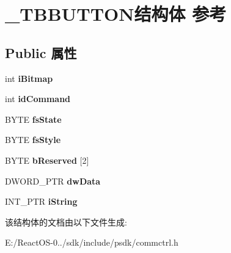 \hypertarget{struct___t_b_b_u_t_t_o_n}{}\section{\+\_\+\+T\+B\+B\+U\+T\+T\+O\+N结构体 参考}
\label{struct___t_b_b_u_t_t_o_n}
\subsection*{Public 属性}
\begin{DoxyCompactItemize}
\item 
\mbox{\label{struct___t_b_b_u_t_t_o_n_a8be01da77c08ef6d0e4f25575a366825}} 
int {\bfseries i\+Bitmap}
\item 
\mbox{\label{struct___t_b_b_u_t_t_o_n_a332c4169bcbc2be63dd246e082feea5c}} 
int {\bfseries id\+Command}
\item 
\mbox{\label{struct___t_b_b_u_t_t_o_n_a1a2644220fd0217d66641430418ebd59}} 
B\+Y\+TE {\bfseries fs\+State}
\item 
\mbox{\label{struct___t_b_b_u_t_t_o_n_a98b0c1cddce46699cb3f9c4b96b4a574}} 
B\+Y\+TE {\bfseries fs\+Style}
\item 
\mbox{\label{struct___t_b_b_u_t_t_o_n_ae18af2a65ad84df26ba4d2f0c4697194}} 
B\+Y\+TE {\bfseries b\+Reserved} \mbox{[}2\mbox{]}
\item 
\mbox{\label{struct___t_b_b_u_t_t_o_n_a3a7664c68c70a2fe191f8fdd9d9efe49}} 
D\+W\+O\+R\+D\+\_\+\+P\+TR {\bfseries dw\+Data}
\item 
\mbox{\label{struct___t_b_b_u_t_t_o_n_a31bc282f9f797be5d1a611cf1ae05401}} 
I\+N\+T\+\_\+\+P\+TR {\bfseries i\+String}
\end{DoxyCompactItemize}


该结构体的文档由以下文件生成\+:\begin{DoxyCompactItemize}
\item 
E\+:/\+React\+O\+S-\/0../sdk/include/psdk/commctrl.\+h\end{DoxyCompactItemize}
